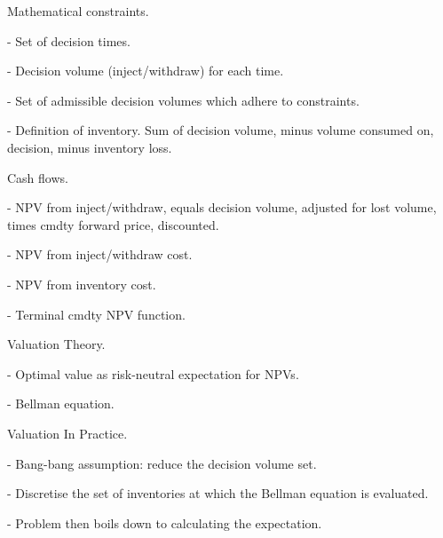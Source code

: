 \documentclass{article}
\begin{document}
Mathematical constraints.

- Set of decision times.

- Decision volume (inject/withdraw) for each time.

- Set of admissible decision volumes which adhere to constraints.

- Definition of inventory. Sum of decision volume, minus volume consumed on,
 decision, minus inventory loss.


\bigskip

Cash flows.

- NPV from inject/withdraw, equals decision volume, adjusted for lost volume,
times cmdty forward price, discounted.

- NPV from inject/withdraw cost.

- NPV from inventory cost.

- Terminal cmdty NPV function.

\bigskip

Valuation Theory.

- Optimal value as risk-neutral expectation for NPVs.

- Bellman equation.

\bigskip

Valuation In Practice.

- Bang-bang assumption: reduce the decision volume set.

- Discretise the set of inventories at which the Bellman equation is evaluated.

- Problem then boils down to calculating the expectation.
\end{document}
